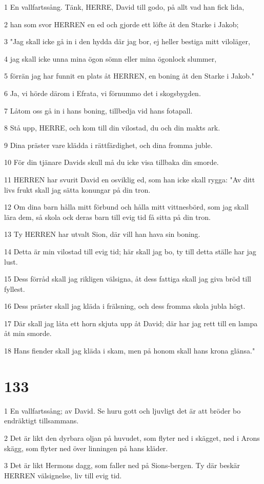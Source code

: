 \par 1 En vallfartssång. Tänk, HERRE, David till godo, på allt vad han fick lida,
\par 2 han som svor HERREN en ed och gjorde ett löfte åt den Starke i Jakob;
\par 3 "Jag skall icke gå in i den hydda där jag bor, ej heller bestiga mitt viloläger,
\par 4 jag skall icke unna mina ögon sömn eller mina ögonlock slummer,
\par 5 förrän jag har funnit en plats åt HERREN, en boning åt den Starke i Jakob."
\par 6 Ja, vi hörde därom i Efrata, vi förnummo det i skogsbygden.
\par 7 Låtom oss gå in i hans boning, tillbedja vid hans fotapall.
\par 8 Stå upp, HERRE, och kom till din vilostad, du och din makts ark.
\par 9 Dina präster vare klädda i rättfärdighet, och dina fromma juble.
\par 10 För din tjänare Davids skull må du icke visa tillbaka din smorde.
\par 11 HERREN har svurit David en osviklig ed, som han icke skall rygga: "Av ditt livs frukt skall jag sätta konungar på din tron.
\par 12 Om dina barn hålla mitt förbund och hålla mitt vittnesbörd, som jag skall lära dem, så skola ock deras barn till evig tid få sitta på din tron.
\par 13 Ty HERREN har utvalt Sion, där vill han hava sin boning.
\par 14 Detta är min vilostad till evig tid; här skall jag bo, ty till detta ställe har jag lust.
\par 15 Dess förråd skall jag rikligen välsigna, åt dess fattiga skall jag giva bröd till fyllest.
\par 16 Dess präster skall jag kläda i frälsning, och dess fromma skola jubla högt.
\par 17 Där skall jag låta ett horn skjuta upp åt David; där har jag rett till en lampa åt min smorde.
\par 18 Hans fiender skall jag kläda i skam, men på honom skall hans krona glänsa."

\chapter{133}

\par 1 En vallfartssång; av David. Se huru gott och ljuvligt det är att bröder bo endräktigt tillsammans.
\par 2 Det är likt den dyrbara oljan på huvudet, som flyter ned i skägget, ned i Arons skägg, som flyter ned över linningen på hans kläder.
\par 3 Det är likt Hermons dagg, som faller ned på Sions-bergen. Ty där beskär HERREN välsignelse, liv till evig tid.

